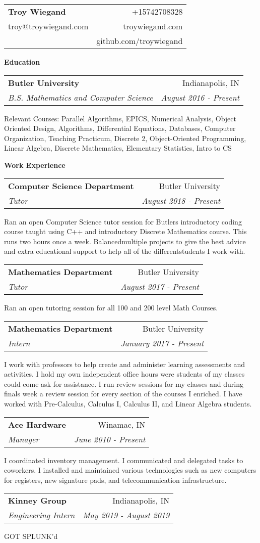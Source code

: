 \documentclass[letterpaper,11pt]{article}
\makeatletter
\newcommand{\resheading}[1]{ \begin{trixiematel}\textbf{#1}\end{trixiematel}}
\newcommand{\ressubheading}[4]{
\begin{tabular*}{6.5in}{l@{\extracolsep{\fill}}r}
                \textbf{#1} & #2 \\
                \textit{#3} & \textit{#4} \\
\end{tabular*}\vspace{2pt}}
\newcommand{\Heading}[5]{
    \begin{tabular*}{7in}{l@{\extracolsep{\fill}}r}
        \textbf{\Large #1}  & #2\\
        #3 & #4 \\
        & #5 \\
        \end{tabular*}}
\makeatother
\begin{document}
\Heading{Troy Wiegand}{+15742708328}{troy@troywiegand.com}{troywiegand.com}{github.com/troywiegand}
\vspace{0.1in}

\resheading{Education}
\begin{description}
\item
\ressubheading{Butler University}{Indianapolis, IN}{B.S. Mathematics and Computer Science}{August 2016 - Present} 


Relevant Courses: Parallel Algorithms, EPICS, Numerical Analysis, Object Oriented Design, Algorithms, Differential Equations, Databases, Computer Organization, Teaching Practicum, Discrete 2, Object-Oriented Programming, Linear Algebra, Discrete Mathematics, Elementary Statistics, Intro to CS

\end{description}

\resheading{Work Experience}
\begin{description}
\item
\ressubheading{Computer Science Department}{Butler University}{Tutor}{August 2018 - Present} 


Ran an open Computer Science tutor session for Butlers introductory coding course taught using C++ and introductory Discrete Mathematics course.  This runs two hours once a week.  Balancedmultiple projects to give the best advice and extra educational support to help all of the differentstudents I work with.

\item
\ressubheading{Mathematics Department}{Butler University}{Tutor}{August 2017 - Present} 


Ran an open tutoring session for all 100 and 200 level Math Courses.

\item
\ressubheading{Mathematics Department}{Butler University}{Intern}{January 2017 - Present} 


I work with professors to help create and administer learning assessments and activities. I hold my own independent office hours were students of my classes could come ask for assistance. I run review sessions for my classes and during finals week a review session for every section of the courses I enriched. I have worked with Pre-Calculus, Calculus I, Calculus II, and Linear Algebra students.

\item
\ressubheading{Ace Hardware}{Winamac, IN}{Manager}{June 2010 - Present} 


I coordinated inventory management. I communicated and delegated tasks to coworkers. I installed and maintained various technologies such as new computers for registers, new signature pads, and telecommunication infrastructure.

\item
\ressubheading{Kinney Group}{Indianapolis, IN}{Engineering Intern}{May 2019 - August 2019} 


GOT SPLUNK'd


 \end{description}
\end{document}
